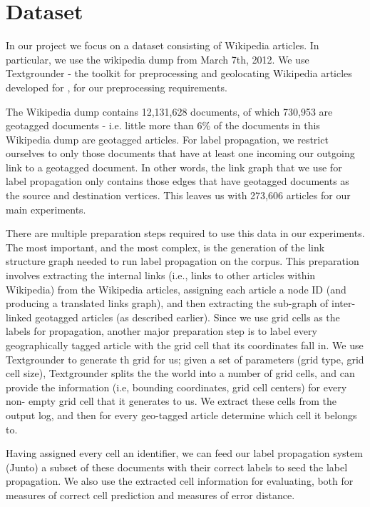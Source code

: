 \section{Dataset} 
\par In our project we focus on a dataset consisting of
Wikipedia articles. In particular, we use the wikipedia dump from March
7th, 2012. We use Textgrounder - the toolkit for preprocessing and geolocating
Wikipedia articles developed for \cite{wing-baldridge:11}, for our
preprocessing requirements.

\par The Wikipedia dump contains 12,131,628 documents,  of which 730,953 are geotagged documents -
i.e. little more than 6\% of the documents in this Wikipedia dump are
geotagged articles.  For label propagation, we restrict ourselves to only
those documents that have at least one incoming our outgoing link to a
geotagged document. In other words, the link graph that we use for label
propagation only contains those edges that have geotagged documents as the
source and destination vertices. This leaves us with 273,606 articles for our
main experiments.

\par There are multiple preparation steps required to use this data in our
experiments. The most important, and the most complex, is the generation of
the  link structure graph needed to run label propagation on the corpus. This
preparation involves extracting the internal links (i.e., links to other
articles within Wikipedia)  from the Wikipedia articles, assigning each
article a node ID (and producing a translated links  graph), and then
extracting the sub-graph of inter-linked geotagged articles (as  described
earlier). Since we use grid cells as the labels for propagation,  another
major preparation step is to label every geographically tagged article  with
the grid cell that its coordinates fall in. We use Textgrounder to generate th
grid for us;  given a set of parameters (grid type, grid cell size),
Textgrounder splits the the world into a number of grid cells, and can provide
the information (i.e, bounding coordinates, grid cell centers) for every  non-
empty grid cell that it generates to us. We extract these cells from the
output  log, and then for every geo-tagged article determine which cell it
belongs to.

\par {}
Having assigned every cell an identifier, we can feed our label propagation 
system (Junto) a subset of these documents with their correct labels to seed the 
label propagation. We also use the extracted cell information for evaluating, 
both for measures of correct cell prediction and measures of error distance.

